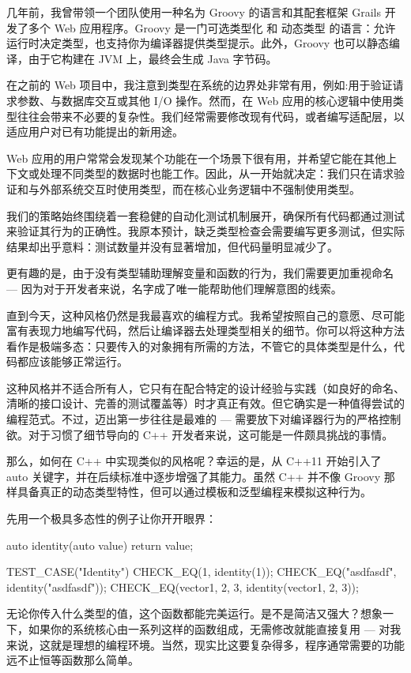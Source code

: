
几年前，我曾带领一个团队使用一种名为 Groovy 的语言和其配套框架 Grails 开发了多个 Web 应用程序。Groovy 是一门可选类型化 和 动态类型 的语言：允许运行时决定类型，也支持你为编译器提供类型提示。此外，Groovy 也可以静态编译，由于它构建在 JVM 上，最终会生成 Java 字节码。

在之前的 Web 项目中，我注意到类型在系统的边界处非常有用，例如:用于验证请求参数、与数据库交互或其他 I/O 操作。然而，在 Web 应用的核心逻辑中使用类型往往会带来不必要的复杂性。我们经常需要修改现有代码，或者编写适配层，以适应用户对已有功能提出的新用途。

Web 应用的用户常常会发现某个功能在一个场景下很有用，并希望它能在其他上下文或处理不同类型的数据时也能工作。因此，从一开始就决定：我们只在请求验证和与外部系统交互时使用类型，而在核心业务逻辑中不强制使用类型。

我们的策略始终围绕着一套稳健的自动化测试机制展开，确保所有代码都通过测试来验证其行为的正确性。我原本预计，缺乏类型检查会需要编写更多测试，但实际结果却出乎意料：测试数量并没有显著增加，但代码量明显减少了。

更有趣的是，由于没有类型辅助理解变量和函数的行为，我们需要更加重视命名 --- 因为对于开发者来说，名字成了唯一能帮助他们理解意图的线索。

直到今天，这种风格仍然是我最喜欢的编程方式。我希望按照自己的意愿、尽可能富有表现力地编写代码，然后让编译器去处理类型相关的细节。你可以将这种方法看作是极端多态：只要传入的对象拥有所需的方法，不管它的具体类型是什么，代码都应该能够正常运行。

这种风格并不适合所有人，它只有在配合特定的设计经验与实践（如良好的命名、清晰的接口设计、完善的测试覆盖等）时才真正有效。但它确实是一种值得尝试的编程范式。不过，迈出第一步往往是最难的 --- 需要放下对编译器行为的严格控制欲。对于习惯了细节导向的 C++ 开发者来说，这可能是一件颇具挑战的事情。

那么，如何在 C++ 中实现类似的风格呢？幸运的是，从 C++11 开始引入了 auto 关键字，并在后续标准中逐步增强了其能力。虽然 C++ 并不像 Groovy 那样具备真正的动态类型特性，但可以通过模板和泛型编程来模拟这种行为。

先用一个极具多态性的例子让你开开眼界：

\begin{cpp}
auto identity(auto value){ return value;}

TEST_CASE("Identity"){
  CHECK_EQ(1, identity(1));
  CHECK_EQ("asdfasdf", identity("asdfasdf"));
  CHECK_EQ(vector{1, 2, 3}, identity(vector{1, 2, 3}));
}
\end{cpp}

无论你传入什么类型的值，这个函数都能完美运行。是不是简洁又强大？想象一下，如果你的系统核心由一系列这样的函数组成，无需修改就能直接复用 --- 对我来说，这就是理想的编程环境。当然，现实比这要复杂得多，程序通常需要的功能远不止恒等函数那么简单。

